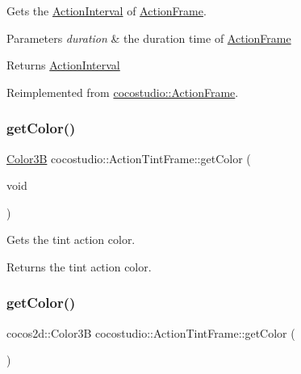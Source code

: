 Gets the \hyperlink{classActionInterval}{Action\+Interval} of \hyperlink{classcocostudio_1_1ActionFrame}{Action\+Frame}.


\begin{DoxyParams}{Parameters}
{\em duration} & the duration time of \hyperlink{classcocostudio_1_1ActionFrame}{Action\+Frame}\\
\hline
\end{DoxyParams}
\begin{DoxyReturn}{Returns}
\hyperlink{classActionInterval}{Action\+Interval} 
\end{DoxyReturn}


Reimplemented from \hyperlink{classcocostudio_1_1ActionFrame_a375216a44f6643d5e771299b1236dc51}{cocostudio\+::\+Action\+Frame}.

\mbox{\label{classcocostudio_1_1ActionTintFrame_a59a626f5811e60cbe788d6c7b028a870}} 
\subsubsection{\texorpdfstring{get\+Color()}{getColor()}\hspace{0.1cm}{\footnotesize\ttfamily [1/2]}}
{\footnotesize\ttfamily \hyperlink{structColor3B}{Color3B} cocostudio\+::\+Action\+Tint\+Frame\+::get\+Color (\begin{DoxyParamCaption}\item[{void}]{ }\end{DoxyParamCaption})}

Gets the tint action color.

\begin{DoxyReturn}{Returns}
the tint action color. 
\end{DoxyReturn}
\mbox{\label{classcocostudio_1_1ActionTintFrame_a308347e4f4f4238062c9b925bd7f691b}} 
\subsubsection{\texorpdfstring{get\+Color()}{getColor()}\hspace{0.1cm}{\footnotesize\ttfamily [2/2]}}
{\footnotesize\ttfamily cocos2d\+::\+Color3B cocostudio\+::\+Action\+Tint\+Frame\+::get\+Color (\begin{DoxyParamCaption}{ }\end{DoxyParamCaption})}

